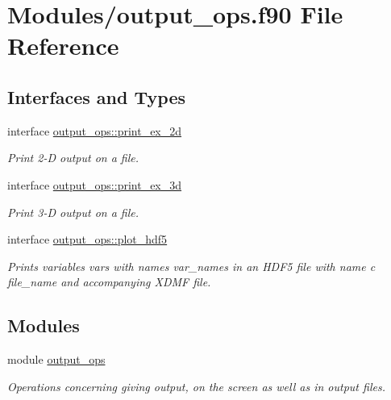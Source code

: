 \hypertarget{output__ops_8f90}{}\section{Modules/output\+\_\+ops.f90 File Reference}
\label{output__ops_8f90}
\subsection*{Interfaces and Types}
\begin{DoxyCompactItemize}
\item 
interface \hyperlink{interfaceoutput__ops_1_1print__ex__2d}{output\+\_\+ops\+::print\+\_\+ex\+\_\+2d}
\begin{DoxyCompactList}\small\item\em Print 2-\/D output on a file. \end{DoxyCompactList}\item 
interface \hyperlink{interfaceoutput__ops_1_1print__ex__3d}{output\+\_\+ops\+::print\+\_\+ex\+\_\+3d}
\begin{DoxyCompactList}\small\item\em Print 3-\/D output on a file. \end{DoxyCompactList}\item 
interface \hyperlink{interfaceoutput__ops_1_1plot__hdf5}{output\+\_\+ops\+::plot\+\_\+hdf5}
\begin{DoxyCompactList}\small\item\em Prints variables {\ttfamily vars} with names {\ttfamily var\+\_\+names} in an H\+D\+F5 file with name c file\+\_\+name and accompanying X\+D\+MF file. \end{DoxyCompactList}\end{DoxyCompactItemize}
\subsection*{Modules}
\begin{DoxyCompactItemize}
\item 
module \hyperlink{namespaceoutput__ops}{output\+\_\+ops}
\begin{DoxyCompactList}\small\item\em Operations concerning giving output, on the screen as well as in output files. \end{DoxyCompactList}\end{DoxyCompactItemize}
